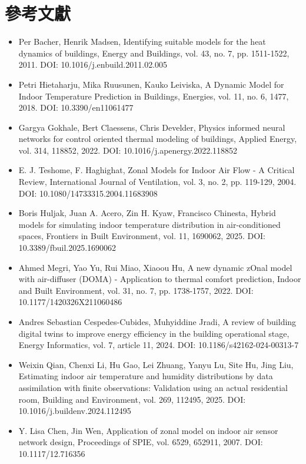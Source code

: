 \documentclass[12pt,a4paper]{article}
\begin{document}
\clearpage

\section*{參考文獻}

\begin{itemize}
\item [1] Per Bacher, Henrik Madsen, Identifying suitable models for the heat dynamics of buildings, Energy and Buildings, vol. 43, no. 7, pp. 1511-1522, 2011. DOI: 10.1016/j.enbuild.2011.02.005
\item [2] Petri Hietaharju, Mika Ruusunen, Kauko Leiviska, A Dynamic Model for Indoor Temperature Prediction in Buildings, Energies, vol. 11, no. 6, 1477, 2018. DOI: 10.3390/en11061477
\item [3] Gargya Gokhale, Bert Claessens, Chris Develder, Physics informed neural networks for control oriented thermal modeling of buildings, Applied Energy, vol. 314, 118852, 2022. DOI: 10.1016/j.apenergy.2022.118852
\item [4] E. J. Teshome, F. Haghighat, Zonal Models for Indoor Air Flow - A Critical Review, International Journal of Ventilation, vol. 3, no. 2, pp. 119-129, 2004. DOI: 10.1080/14733315.2004.11683908
\item [5] Boris Huljak, Juan A. Acero, Zin H. Kyaw, Francisco Chinesta, Hybrid models for simulating indoor temperature distribution in air-conditioned spaces, Frontiers in Built Environment, vol. 11, 1690062, 2025. DOI: 10.3389/fbuil.2025.1690062
\item [6] Ahmed Megri, Yao Yu, Rui Miao, Xiaoou Hu, A new dynamic zOnal model with air-diffuser (DOMA) - Application to thermal comfort prediction, Indoor and Built Environment, vol. 31, no. 7, pp. 1738-1757, 2022. DOI: 10.1177/1420326X211060486
\item [7] Andres Sebastian Cespedes-Cubides, Muhyiddine Jradi, A review of building digital twins to improve energy efficiency in the building operational stage, Energy Informatics, vol. 7, article 11, 2024. DOI: 10.1186/s42162-024-00313-7
\item [8] Weixin Qian, Chenxi Li, Hu Gao, Lei Zhuang, Yanyu Lu, Site Hu, Jing Liu, Estimating indoor air temperature and humidity distributions by data assimilation with finite observations: Validation using an actual residential room, Building and Environment, vol. 269, 112495, 2025. DOI: 10.1016/j.buildenv.2024.112495
\item [9] Y. Lisa Chen, Jin Wen, Application of zonal model on indoor air sensor network design, Proceedings of SPIE, vol. 6529, 652911, 2007. DOI: 10.1117/12.716356

\end{itemize}
\end{document}

